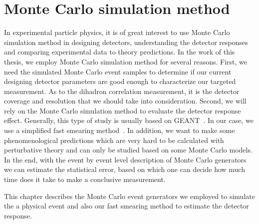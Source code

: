 \chapter{Monte Carlo simulation method} \label{chp:MC}

In experimental particle physics, it is of great interest to use Monte Carlo
simulation method in designing detectors, understanding the detector responses
and comparing experimental data to theory predictions. In the work of this
thesis, we employ Monte Carlo simulation method for several reasons. First, we
need the simulated Monte Carlo event samples to determine if our current
designing detector parameters are good enough to characterize our targeted
measurement. As to the dihadron correlation measurement, it is the detector
coverage and resolution that we should take into consideration. Second, we will
rely on the Monte Carlo simulation method to evaluate the detector response
effect. Generally, this type of study is usually based on
GEANT~\cite{Brun:1978fy}. In our case, we use a simplified fast smearing method~\cite{eicsmear}.
In addition, we want to make some phenomenological predictions which are very
hard to be calculated with perturbative theory and can only be studied based on
some Monte Carlo models. In the end, with the event by event level description
of Monte Carlo generators we can estimate the statistical error, based on which
one can decide how much time does it take to make a conclusive measurement.

This chapter describes the Monte Carlo event generators we employed to simulate
the a physical event and also our fast smearing method to estimate the detector response.


